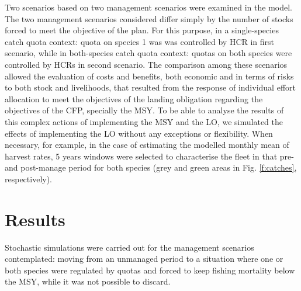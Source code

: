 \documentclass[12pt,oneline,a4paper,numbib]{ouparticle}
\numberwithin{equation}{subsection} %
\begin{document}
Two scenarios based on two management scenarios were examined in the model. The two management scenarios considered differ simply by the number of stocks forced to meet the objective of the plan. For this purpose, in a single-species catch quota context: quota on species 1 was was controlled by HCR in first scenario, while in both-species catch quota context: quotas on both species were controlled by HCRs in second scenario. The comparison among these scenarios allowed the evaluation of costs and benefits, both economic and in terms of risks to both stock and livelihoods, that resulted from the response of individual effort allocation to meet the objectives of the landing obligation regarding the objectives of the CFP, specially the MSY. To be able to analyse the results of this complex actions of implementing the MSY and the LO, we simulated the effects of implementing the LO without any exceptions or flexibility. When necessary, for example, in the case of estimating the modelled monthly mean of harvest rates, 5 years windows were selected to characterise the fleet in that pre- and post-manage period for both species (grey and green areas in Fig. \ref{f:catches}, respectively).
 


\section{Results}

Stochastic simulations were carried out for the management scenarios contemplated: moving from an unmanaged period to a situation where one or both species were regulated by quotas and forced to keep fishing mortality below the MSY, while it was not possible to discard. 
\end{document}
